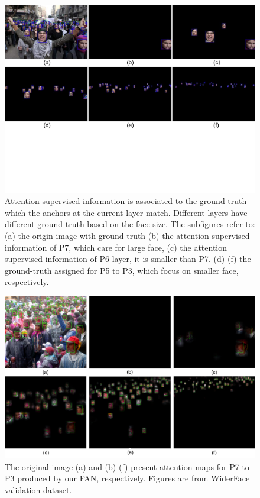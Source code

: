 \documentclass[10pt,twocolumn,letterpaper]{article}
\begin{document}
\begin{figure}[t]
\begin{center}
    \includegraphics[width=0.9\linewidth]{mask_gt.pdf}
\end{center}
    \vskip -2cm
    \caption{Attention supervised information is associated to the ground-truth which the anchors at the current layer match. Different layers have different ground-truth based on the face size. The subfigures refer to: (a) the origin image with ground-truth (b) the attention supervised information of P7, which care for large face, (c) the attention supervised information of P6 layer, it is smaller than P7. (d)-(f) the ground-truth assigned for P5 to P3, which focus on smaller face, respectively.}
\label{fig:attention_gt}
\end{figure}

\begin{figure}[t]
\begin{center}
    \includegraphics[width=0.9\linewidth]{occlusion.pdf}
\end{center}
    \caption{The original image (a) and (b)-(f) present attention maps for P7 to P3 produced by our FAN, respectively. Figures are from WiderFace validation dataset.} 
\label{fig:occlusion_attention}
\end{figure}
\end{document}
